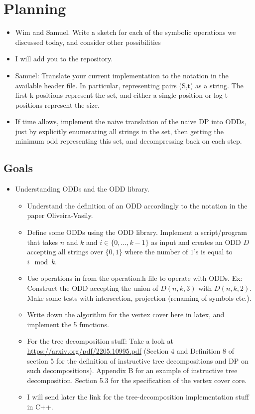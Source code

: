 \newpage 

\section{Planning}



\begin{itemize}
    \item Wim and Samuel. Write a sketch for each of the symbolic operations we discussed today, and consider other possibilities
    \item I will add you to the repository. 
    \item Samuel: Translate your current implementation to the notation in the available header file. In particular, representing pairs (S,t) as a string. The first k positions represent the set, and either a single position or log t positions represent the size. 
    \item If time allows, implement the naive translation of the naive DP into ODDs, just by explicitly enumerating all strings in the set, then getting the minimum odd representing this set, and decompressing back on each step. 

\end{itemize}


\subsection{Goals}

\begin{itemize}
\item Understanding ODDs and the ODD library. 
\begin{itemize}
\item Understand the definition of an ODD accordingly to the notation in the paper Oliveira-Vasily. 
\item Define some ODDs using the ODD library. Implement a script/program that takes $n$ and $k$ and $i\in \{0,...,k-1\}$ as input and creates an ODD $D$ accepting all strings over $\{0,1\}$ where the number of $1$'s is equal to $i \mod k$. 
\item Use operations in from the operation.h file to operate with ODDs. Ex: Construct the ODD accepting the union of $D(n,k,3)$ with $D(n,k,2)$. Make some tests with intersection, projection (renaming of symbols etc.).
\item Write down the algorithm for the vertex cover here in latex, and implement the 5 functions. 
\item For the tree decomposition stuff: Take a look at \url{https://arxiv.org/pdf/2205.10995.pdf} (Section 4 and Definition 8 of section 5 for the definition of instructive tree decompositions and DP on such decompositions).   Appendix B for an example of instructive tree decomposition. Section 5.3 for the specification of the vertex cover core. 
\item I will send later the link for the tree-decomposition implementation stuff in C++.
\end{itemize}
\end{itemize}

